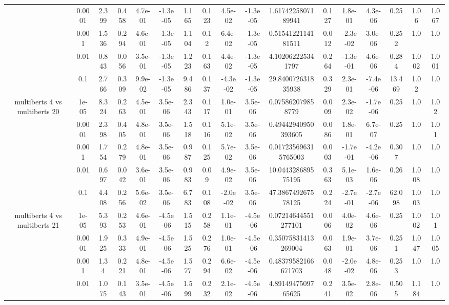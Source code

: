\begin{tabular}{|c|c|c|c|c|c|c|c|c|c|c|c|c|c|c|c|c|}
 & 0.0001 & 2.399 & 0.458 & 4.7e-01 & -1.3e-05 & 1.165 & 0.123 & 4.5e-02 & -1.3e-05 & 1.6174225807189941 & 0.127 & 1.8e-01 & 4.3e-06 & 0.25 & 1.06 & 1.067 \\
 & 0.001 & 1.536 & 0.294 & 4.6e-01 & -1.3e-05 & 1.104 & 0.12 & 6.4e-02 & -1.3e-05 & 0.5154122114181511 & 0.012 & -2.3e-02 & 3.0e-06 & 0.252 & 1.0 & 1.0 \\
 & 0.01 & 0.843 & 0.056 & 3.5e-01 & -1.3e-05 & 1.223 & 0.163 & 4.4e-02 & -1.3e-05 & 4.102062225341797 & 0.264 & -1.3e-01 & 4.6e-06 & 0.284 & 1.002 & 1.001 \\
 & 0.1 & 2.766 & 0.309 & 9.9e-02 & -1.3e-05 & 9.486 & 0.137 & -4.3e-02 & -1.3e-05 & 29.840072631835938 & 0.329 & 2.3e-01 & -7.4e-06 & 13.469 & 1.02 & 1.0 \\
\hline
\multirow{5}{*}{multiberts 4 vs multiberts 20} & 1e-05 & 8.324 & 0.263 & 4.5e-01 & 3.5e-06 & 2.343 & 0.117 & 1.0e-01 & 3.5e-06 & 0.075862079858779 & 0.009 & 2.3e-02 & -1.7e-06 & 0.25 & 1.0 & 1.02 \\
 & 0.0001 & 2.398 & 0.405 & 4.8e-01 & 3.5e-06 & 1.518 & 0.116 & 5.1e-02 & 3.5e-06 & 0.49442940950393605 & 0.086 & 1.8e-01 & 6.7e-07 & 0.25 & 1.0 & 1.01 \\
 & 0.001 & 1.754 & 0.279 & 4.8e-01 & 3.5e-06 & 0.987 & 0.125 & 5.7e-02 & 3.5e-06 & 0.017235696315765003 & 0.003 & -1.7e-01 & -4.2e-06 & 0.307 & 1.0 & 1.0 \\
 & 0.01 & 0.697 & 0.042 & 3.6e-01 & 3.5e-06 & 0.983 & 0.09 & 4.9e-02 & 3.5e-06 & 10.044328689575195 & 0.363 & 5.1e-03 & 1.6e-06 & 0.26 & 1.008 & 1.0 \\
 & 0.1 & 4.408 & 0.256 & 5.6e-02 & 3.5e-06 & 6.783 & 0.108 & -2.0e-02 & 3.5e-06 & 47.386749267578125 & 0.224 & -2.7e-01 & -2.7e-06 & 62.098 & 1.003 & 1.0 \\
\hline
\multirow{5}{*}{multiberts 4 vs multiberts 21} & 1e-05 & 5.393 & 0.253 & 4.6e-01 & -4.5e-06 & 1.515 & 0.258 & 1.1e-01 & -4.5e-06 & 0.07214644551277101 & 0.006 & 4.0e-02 & 4.6e-06 & 0.25 & 1.002 & 1.01 \\
 & 0.0001 & 1.925 & 0.333 & 4.9e-01 & -4.5e-06 & 1.525 & 0.276 & 1.0e-01 & -4.5e-06 & 0.35075831413269004 & 0.063 & 1.9e-01 & 3.7e-06 & 0.251 & 1.047 & 1.005 \\
 & 0.001 & 1.34 & 0.221 & 4.8e-01 & -4.5e-06 & 1.577 & 0.294 & 6.6e-02 & -4.5e-06 & 0.48379582166671703 & 0.048 & -2.0e-02 & 4.8e-06 & 0.253 & 1.0 & 1.0 \\
 & 0.01 & 1.075 & 0.143 & 3.5e-01 & -4.5e-06 & 1.599 & 0.232 & 2.1e-02 & -4.5e-06 & 4.8914947509765625 & 0.241 & 3.5e-02 & 2.8e-06 & 0.505 & 1.184 & 1.0 \\

\end{tabular}
